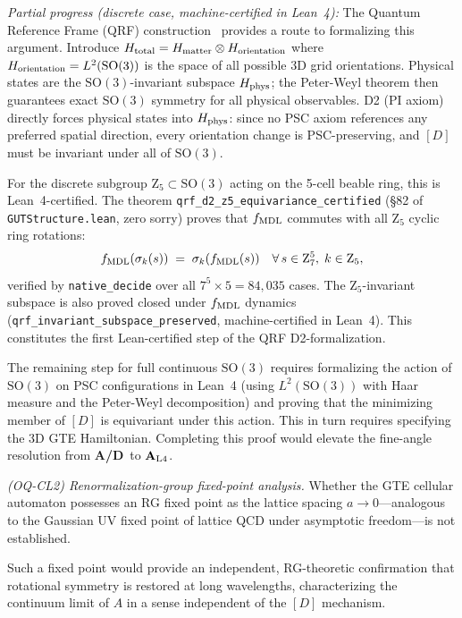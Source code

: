 \documentclass[12pt,letterpaper]{article}
\newcommand{\Dclass}{[D]}
\newcommand{\catAL}{\ensuremath{\textbf{A}_{\rm L4}}}
\newcommand{\catAD}{\textbf{A/D}}
\begin{document}
\emph{Partial progress (discrete case, machine-certified in Lean~4):} The Quantum Reference Frame
(QRF) construction~\cite{Bartlett2007} provides a route to formalizing this
argument.  Introduce $H_{\rm total} = H_{\rm matter} \otimes H_{\rm orientation}$
where $H_{\rm orientation} = L^2(\mathrm{SO}(3))$ is the space of all possible
3D grid orientations.  Physical states are the $\mathrm{SO}(3)$-invariant
subspace $H_{\rm phys}$; the Peter-Weyl theorem then guarantees exact
$\mathrm{SO}(3)$ symmetry for all physical observables.  D2 (PI axiom) directly
forces physical states into $H_{\rm phys}$: since no PSC axiom references any
preferred spatial direction, every orientation change is PSC-preserving, and
$[D]$ must be invariant under all of $\mathrm{SO}(3)$.

For the discrete subgroup $\mathrm{Z}_5 \subset \mathrm{SO}(3)$ acting on the
5-cell beable ring, this is Lean~4-certified.  The theorem
\texttt{qrf\_d2\_z5\_equivariance\_certified} (\S82 of \texttt{GUTStructure.lean},
zero sorry) proves that $f_{\rm MDL}$ commutes with all $\mathrm{Z}_5$ cyclic
ring rotations:
\[
  f_{\rm MDL}(\sigma_k(s)) \;=\; \sigma_k(f_{\rm MDL}(s))
  \quad \forall\, s \in \mathrm{Z}_7^5,\; k \in \mathrm{Z}_5,
\]
verified by \texttt{native\_decide} over all $7^5 \times 5 = 84{,}035$ cases.
The $\mathrm{Z}_5$-invariant subspace is also proved closed under $f_{\rm MDL}$
dynamics (\texttt{qrf\_invariant\_subspace\_preserved}, machine-certified in Lean~4).  This constitutes
the first Lean-certified step of the QRF D2-formalization.

The remaining step for full continuous $\mathrm{SO}(3)$ requires formalizing the
action of $\mathrm{SO}(3)$ on PSC configurations in Lean~4 (using
$L^2(\mathrm{SO}(3))$ with Haar measure and the Peter-Weyl decomposition) and
proving that the minimizing member of $\Dclass$ is equivariant under this action.
This in turn requires specifying the 3D GTE Hamiltonian.  Completing this proof
would elevate the fine-angle resolution from \catAD\ to \catAL.

\textit{(OQ-CL2) Renormalization-group fixed-point analysis.}
Whether the GTE cellular automaton possesses an RG fixed point as the lattice spacing
$a \to 0$---analogous to the Gaussian UV fixed point of lattice QCD under asymptotic
freedom---is not established.

Such a fixed point would provide an independent, RG-theoretic confirmation that
rotational symmetry is restored at long wavelengths, characterizing the continuum limit
of $A$ in a sense independent of the $\Dclass$ mechanism.
\end{document}
